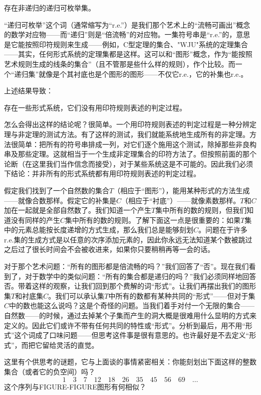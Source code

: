 \begin{block}
存在非递归的递归可枚举集。
\end{block}
“递归可枚举”这个词（通常缩写为“r.e.”）是我们那个艺术上的“流畅可画出”概念的数学对应物——而“递归”则是“倍流畅”的对应物。一集符号串是“r.e.”的，意思是它能按照印符规则来生成——例如，C型定理的集合、"WJU"系统的定理集合——其实，任何形式系统的定理集都是这样。这可以和“图形”概念，作为“能按照艺术规则生成的线条的集合”（且不管那是些什么样的规则），作个比较。而一个“递归集”就像是个其衬底也是个图形的图形——不仅它r.e.，它的补集也r.e.。

上述结果导致：

\begin{block}
存在一些形式系统，它们没有用印符规则表述的判定过程。
\end{block}
怎么会得出这样的结论呢？很简单。一个用印符规则表述的判定过程是一种分辨定理与非定理的测试方法。有了这样的测试，我们就能系统地生成所有的非定理。方法很简单：把所有的符号串排成一列，对它们逐个施用这个测试，除掉那些非良构串及那些定理。这就相当于一个生成非定理集合的印符方法了。但按照前面的那个论断（在这里我们当作信念而接受），对于某些系统这是不可能的。因此我们必须下结论：并非所有的形式系统都有用印符规则表述的判定过程。

假定我们找到了一个自然数的集合$T$（相应于“图形”），能用某种形式的方法生成——就像合数那样。假定它的补集是$C$（相应于“衬底”）——就像素数那样。$T$和$C$加在一起就是全部自然数了。我们知道一个产生$T$集中所有的数的规则，但我们知道没有同样的产生$C$集中所有的数的规则。了解下面这一点是很重要的：如果$T$集中的元素总能按长度递增的方式生成，那么我们总是能够刻划$C$。问题在于许多r.e.集的生成方式是以任意的次序添加元素的，因此你永远无法知道某个数被跳过之后过了很长时间会不会被收进来，如果你只要稍稍再等一会的话。

对于那个艺术问题：“所有的图形都是倍流畅的吗？”我们回答了“否”。现在我们看到了，对于数学中的类似问题：“所有的集合都是递归的吗？”我们必须同样地回答否。带着这样的观察，让我们回到那个费解的词“形式”。让我们再摆出我们的图形集$T$和衬底集$C$。我们可以承认集$T$中所有的数都有某种共同的“形式”——但对于集$C$中的数也能这么说吗？这是个奇怪的问题。当我们着手对付一个无限的集合——自然数——的时候，通过去掉某个子集而产生的洞大概是很难用什么显明的方式来定义的。因此它们或许不带有任何共同的特性或“形式”。分析到最后，用不用“形式”这个词成了口味问题——但思考这件事是很有意思的。也许最好是不去定义“形式”，而把它留给灵活的直觉。

这里有个供思考的谜题，它与上面谈的事情紧密相关：你能刻划出下面这样的整数集合（或者它的负空间）吗？
\[
1\quad 3\quad 7\quad 12\quad 18\quad 26\quad 35\quad 45\quad 56\quad 69
\quad\ldots
\]
这个序列与FIGURE-FIGURE图形有何相似？

